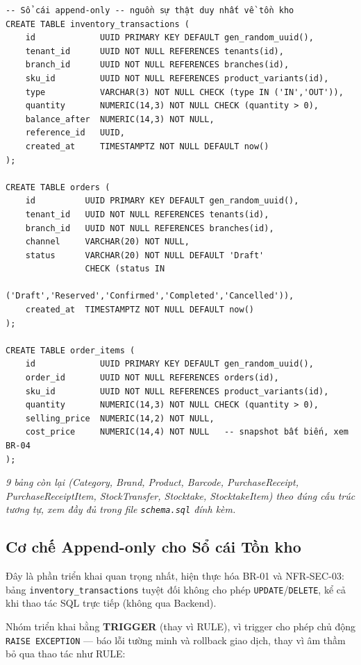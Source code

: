 \begin{lstlisting}
-- Sổ cái append-only -- nguồn sự thật duy nhất về tồn kho
CREATE TABLE inventory_transactions (
    id             UUID PRIMARY KEY DEFAULT gen_random_uuid(),
    tenant_id      UUID NOT NULL REFERENCES tenants(id),
    branch_id      UUID NOT NULL REFERENCES branches(id),
    sku_id         UUID NOT NULL REFERENCES product_variants(id),
    type           VARCHAR(3) NOT NULL CHECK (type IN ('IN','OUT')),
    quantity       NUMERIC(14,3) NOT NULL CHECK (quantity > 0),
    balance_after  NUMERIC(14,3) NOT NULL,
    reference_id   UUID,
    created_at     TIMESTAMPTZ NOT NULL DEFAULT now()
);

CREATE TABLE orders (
    id          UUID PRIMARY KEY DEFAULT gen_random_uuid(),
    tenant_id   UUID NOT NULL REFERENCES tenants(id),
    branch_id   UUID NOT NULL REFERENCES branches(id),
    channel     VARCHAR(20) NOT NULL,
    status      VARCHAR(20) NOT NULL DEFAULT 'Draft'
                CHECK (status IN
                    ('Draft','Reserved','Confirmed','Completed','Cancelled')),
    created_at  TIMESTAMPTZ NOT NULL DEFAULT now()
);

CREATE TABLE order_items (
    id             UUID PRIMARY KEY DEFAULT gen_random_uuid(),
    order_id       UUID NOT NULL REFERENCES orders(id),
    sku_id         UUID NOT NULL REFERENCES product_variants(id),
    quantity       NUMERIC(14,3) NOT NULL CHECK (quantity > 0),
    selling_price  NUMERIC(14,2) NOT NULL,
    cost_price     NUMERIC(14,4) NOT NULL   -- snapshot bất biến, xem BR-04
);
\end{lstlisting}

\textit{9 bảng còn lại (Category, Brand, Product, Barcode, PurchaseReceipt, PurchaseReceiptItem, StockTransfer, Stocktake, StocktakeItem) theo đúng cấu trúc tương tự, xem đầy đủ trong file \texttt{schema.sql} đính kèm.}

\subsection{Cơ chế Append-only cho Sổ cái Tồn kho}
\label{sec:append-only}
Đây là phần triển khai quan trọng nhất, hiện thực hóa BR-01 và NFR-SEC-03: bảng \texttt{inventory\_transactions} tuyệt đối không cho phép \texttt{UPDATE}/\texttt{DELETE}, kể cả khi thao tác SQL trực tiếp (không qua Backend).

Nhóm triển khai bằng \textbf{TRIGGER} (thay vì RULE), vì trigger cho phép chủ động \texttt{RAISE EXCEPTION} — báo lỗi tường minh và rollback giao dịch, thay vì âm thầm bỏ qua thao tác như RULE:

